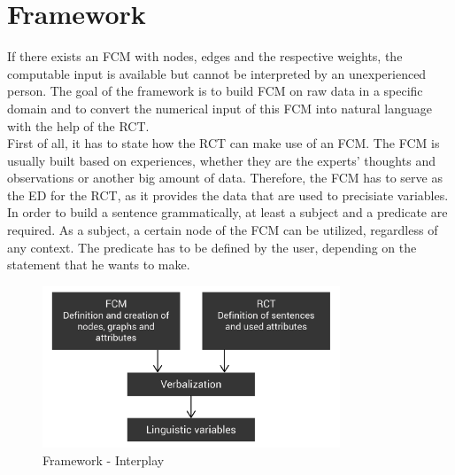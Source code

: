 \documentclass[conference]{IEEEtran}
\begin{document}
\section{Framework}
\label{sec:framework}
If there exists an FCM with nodes, edges and the respective weights, the computable input is available but cannot be interpreted by an unexperienced person. The goal of the framework is to build FCM on raw data in a specific domain and to convert the numerical input of this FCM into natural language with the help of the RCT.\\
First of all, it has to state how the RCT can make use of an FCM. The FCM is usually built based on experiences, whether they are the experts' thoughts and observations or another big amount of data. Therefore, the FCM has to serve as the ED for the RCT, as it provides the data that are used to precisiate variables.\\
In order to build a sentence grammatically, at least a subject and a predicate are required. As a subject, a certain node of the FCM can be utilized, regardless of any context. The predicate has to be defined by the user, depending on the statement that he wants to make.\\

\begin{figure}[ht]
\includegraphics[width=3.5in]{img/framework.png}
\centering
\caption{Framework - Interplay}
\label{fig:framework}
\end{figure}
\end{document}
